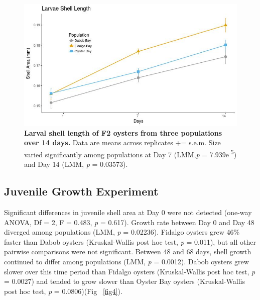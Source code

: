 \documentclass[10pt,letterpaper]{article}
\begin{document}
\begin{figure}[!h]
\includegraphics[width=0.7\linewidth]{Larvae_Length_Line_PS215_color.jpeg}
\caption{{\bf Larval shell length of F2 oysters from three populations over 14 days.}
Data are means across replicates += s.e.m. Size varied significantly among populations at Day 7 (LMM,\textit{p} = 7.939e\textsuperscript{-5}) and Day 14 (LMM, \textit{p} = 0.03573).}
\label{fig3}
\end{figure}

\subsection*{Juvenile Growth Experiment}
Significant differences in juvenile shell area at Day 0 were not detected (one-way ANOVA, Df = 2, F = 0.483, \textit{p} = 0.617). Growth rate between Day 0 and Day 48 diverged among populations (LMM, \textit{p} = 0.02236). Fidalgo oysters grew 46\% faster than Dabob oysters (Kruskal-Wallis post hoc test, \textit{p} = 0.011), but all other pairwise comparisons were not significant. Between 48 and 68 days, shell growth continued to differ among populations (LMM, \textit{p} = 0.0012). Dabob oysters grew slower over this time period than Fidalgo oysters (Kruskal-Wallis post hoc test, \textit{p} = 0.0027) and tended to grow slower than Oyster Bay oysters (Kruskal-Wallis post hoc test, \textit{p} = 0.0806)(Fig ~\ref{fig4}).
\end{document}

